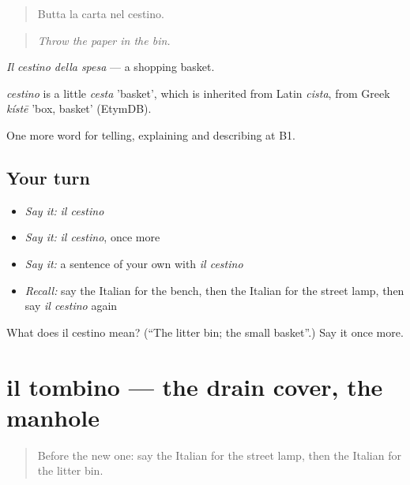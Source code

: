 \begin{quote}
Butta la carta nel cestino.
\end{quote}

\begin{quote}
\emph{Throw the paper in the bin.}
\end{quote}

\emph{Il cestino della spesa} — a shopping basket.

\begin{cousinweb}
\emph{cestino} is a little \emph{cesta} 'basket', which is inherited from Latin \emph{cista}, from Greek \emph{kístē} 'box, basket' (EtymDB).
\end{cousinweb}

\begin{grammarlens}[title={What you've built}]
One more word for telling, explaining and describing at B1.
\end{grammarlens}

\subsection*{Your turn}
\begin{itemize}
\raggedright
  \item \emph{Say it:} \emph{il cestino}
  \item \emph{Say it:} \emph{il cestino}, once more
  \item \emph{Say it:} a sentence of your own with \emph{il cestino}
  \item \emph{Recall:} say the Italian for the bench, then the Italian for the street lamp, then say \emph{il cestino} again
\end{itemize}

\begin{tcolorbox}[breakable,colback=teal!4,colframe=teal!35!black,title={Before you move on}]
What does il cestino mean? (\textquotedblleft{}The litter bin; the small basket\textquotedblright{}.) Say it once more.
\end{tcolorbox}
\section[il tombino]{il tombino — the drain cover, the manhole}

\label{lesson:IT-C448-tombino}



\begin{quote}
Before the new one: say the Italian for the street lamp, then the Italian for the litter bin.
\end{quote}

